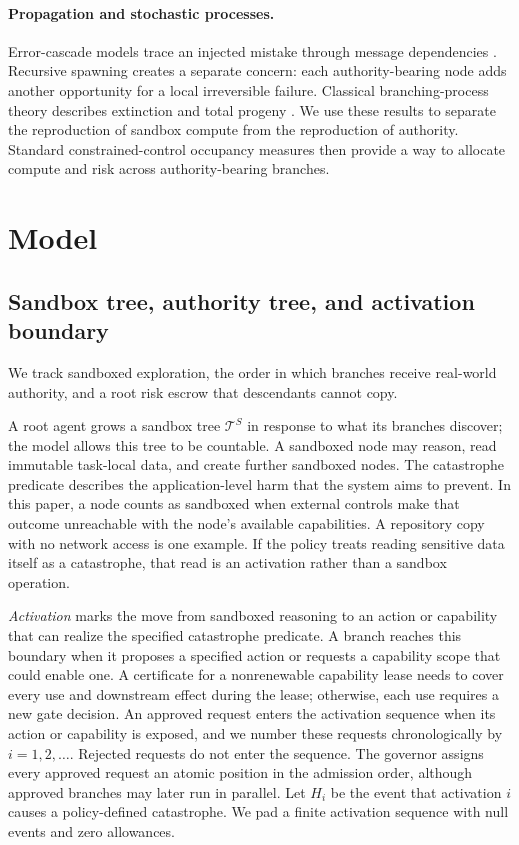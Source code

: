 \documentclass[sigconf,nonacm]{acmart}
\begin{document}
\paragraph{Propagation and stochastic processes.}
Error-cascade models trace an injected mistake through message dependencies
\cite{xie2026spark}.  Recursive spawning creates a separate concern: each authority-bearing
node adds another opportunity for a local irreversible failure.  Classical branching-process
theory describes extinction and total progeny \cite{athreya1972branching}.  We use these results
to separate the reproduction of sandbox compute from the reproduction of authority.  Standard
constrained-control occupancy measures \cite{altman1999cmdp} then provide a way to allocate
compute and risk across authority-bearing branches.

\section{Model}

\subsection{Sandbox tree, authority tree, and activation boundary}

We track sandboxed exploration, the order in which branches receive real-world authority, and a
root risk escrow that descendants cannot copy.

A root agent grows a sandbox tree $\mathcal T^S$ in response to what its branches discover; the
model allows this tree to be countable.  A sandboxed node may reason, read immutable task-local
data, and create further sandboxed nodes.  The catastrophe predicate describes the
application-level harm that the system aims to prevent.  In this paper, a node counts as
sandboxed when external controls make that outcome unreachable with the node's available
capabilities.  A repository copy with no network access is one example.  If the policy treats
reading sensitive data itself as a catastrophe, that read is an activation rather than a sandbox
operation.

\emph{Activation} marks the move from sandboxed reasoning to an action or capability that can
realize the specified catastrophe predicate.  A branch reaches this boundary when it proposes a
specified action or requests a capability scope that could enable one.  A certificate for a
nonrenewable capability lease needs to cover every use and downstream effect during the lease;
otherwise, each use requires a new gate decision.  An approved request enters the activation
sequence when its action or capability is exposed, and we number these requests chronologically by
$i=1,2,\ldots$.  Rejected requests do not enter the sequence.  The governor assigns every approved
request an atomic position in the admission order, although approved branches may later run in
parallel.  Let $H_i$ be the event that activation $i$ causes a policy-defined catastrophe.  We pad
a finite activation sequence with null events and zero allowances.
\end{document}
